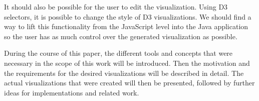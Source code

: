 It should also be possible for the user to edit the visualization. Using D3 selectors, it is possible to change the style of D3 visualizations. We should find a way to lift this functionality from the JavaScript level into the Java application so the user has as much control over the generated visualization as possible.

During the course of this paper, the different tools and concepts that were necessary in the scope of this work will be introduced. Then the motivation and the requirements for the desired visualizations will be described in detail. The actual visualizations that were created will then be presented, followed by further ideas for implementations and related work.